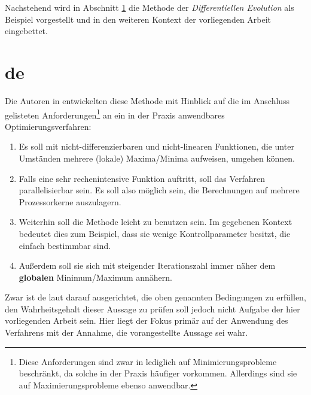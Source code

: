 		Nachstehend wird in Abschnitt \ref{sec:de} die Methode der 
		\textit{Differentiellen Evolution} als Beispiel vorgestellt und in den 
		weiteren Kontext der vorliegenden Arbeit eingebettet.
	

	\section{\gls{de}}
	\label{sec:de}

		Die Autoren in \cite{storn-price-de} entwickelten diese Methode mit 
		Hinblick auf die im Anschluss gelisteten Anforderungen\footnote{Diese 
		Anforderungen sind zwar in \cite{storn-price-de} lediglich auf 
		Minimierungsprobleme beschränkt, da solche in der Praxis häufiger 
		vorkommen. Allerdings sind sie auf Maximierungsprobleme ebenso 
		anwendbar.}
		an ein in der Praxis anwendbares Optimierungsverfahren:
		\begin{enumerate}
			\item Es soll mit nicht-differenzierbaren und nicht-linearen 
			Funktionen, die unter Umständen mehrere (lokale) Maxima/Minima 
			aufweisen, umgehen können.
			\item Falls eine sehr rechenintensive Funktion auftritt, soll das 
			Verfahren parallelisierbar sein. Es soll also möglich sein, die 
			Berechnungen auf mehrere Prozessorkerne auszulagern.
			\item Weiterhin soll die Methode leicht zu benutzen sein. Im 
			gegebenen Kontext bedeutet dies zum Beispiel, dass sie wenige 
			Kontrollparameter besitzt, die einfach bestimmbar sind.
			\item Außerdem soll sie sich mit steigender Iterationszahl immer 
			näher dem \textbf{globalen} Minimum/Maximum annähern.
		\end{enumerate}
		Zwar ist \gls{de} laut \cite{storn-price-de} darauf ausgerichtet, die 
		oben genannten Bedingungen zu erfüllen, den Wahrheitsgehalt dieser 
		Aussage zu prüfen soll jedoch nicht Aufgabe der hier vorliegenden 
		Arbeit sein. Hier liegt der Fokus primär auf der Anwendung des 
		Verfahrens mit der Annahme, die vorangestellte Aussage sei wahr. 
		
